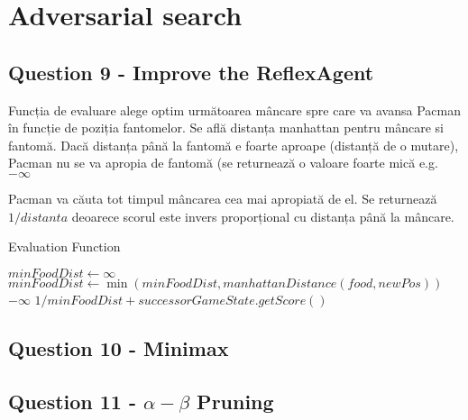 \pagebreak

\section{Adversarial search}
\subsection{Question 9 - Improve the ReflexAgent} 

\par Funcția de evaluare alege optim următoarea mâncare spre care va avansa Pacman în funcție de poziția fantomelor. Se află distanța manhattan pentru mâncare si fantomă. Dacă distanța până la fantomă e foarte aproape (distanță de o mutare), Pacman nu se va apropia de fantomă (se returnează o valoare foarte mică e.g. $	- \infty$
\par Pacman va căuta tot timpul mâncarea cea mai apropiată de el. Se returnează $1 / distanta$ deoarece scorul este invers proporțional cu distanța până la mâncare. 

\begin{algorithm}
\caption{Evaluation Function}
\begin{algorithmic}[1]
    \State $minFoodDist \gets \infty$
        \State $minFoodDist \gets \min(minFoodDist, manhattanDistance(food, newPos))$
    \EndFor
            \Return $-\infty$
        \EndIf
    \EndFor
    \State \Return $1 / minFoodDist + successorGameState.getScore()$
\EndProcedure
\end{algorithmic}
\end{algorithm}
\pagebreak
\subsection{Question 10 - Minimax}
\subsection{Question 11 - $\alpha - \beta$ Pruning}  